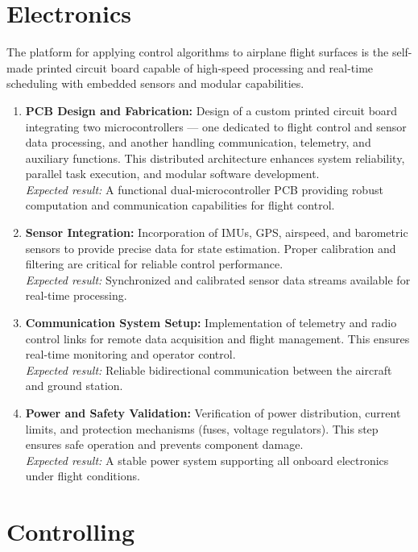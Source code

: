 \section{Electronics}

The platform for applying control algorithms to airplane flight surfaces is the self-made printed circuit board capable of high-speed processing and real-time scheduling with embedded sensors and modular capabilities.

\begin{enumerate}
    \item \textbf{PCB Design and Fabrication:} Design of a custom printed circuit board integrating two microcontrollers — one dedicated to flight control and sensor data processing, and another handling communication, telemetry, and auxiliary functions. This distributed architecture enhances system reliability, parallel task execution, and modular software development. \\
    \textit{Expected result:} A functional dual-microcontroller PCB providing robust computation and communication capabilities for flight control.

    \item \textbf{Sensor Integration:} Incorporation of IMUs, GPS, airspeed, and barometric sensors to provide precise data for state estimation. Proper calibration and filtering are critical for reliable control performance. \\
    \textit{Expected result:} Synchronized and calibrated sensor data streams available for real-time processing.

    \item \textbf{Communication System Setup:} Implementation of telemetry and radio control links for remote data acquisition and flight management. This ensures real-time monitoring and operator control. \\
    \textit{Expected result:} Reliable bidirectional communication between the aircraft and ground station.

    \item \textbf{Power and Safety Validation:} Verification of power distribution, current limits, and protection mechanisms (fuses, voltage regulators). This step ensures safe operation and prevents component damage. \\
    \textit{Expected result:} A stable power system supporting all onboard electronics under flight conditions.
\end{enumerate}

\section{Controlling}

